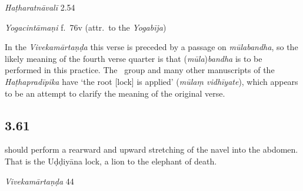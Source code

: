 \begin{ekdosis}
\begin{testimonia}[hp03_060]
\emph{Haṭharatnāvalī} 2.54
\begin{versinnote}
\end{versinnote}

\emph{Yogacintāmaṇi} f.~76v (attr.~to the \emph{Yogabīja})
\begin{versinnote}
\end{versinnote}

\end{testimonia}

\begin{philcomm}[hp03_060]
In the \emph{Vivekamārtaṇḍa} this verse is preceded by a passage on \emph{mūlabandha}, so the likely meaning of the fourth verse quarter is that (\emph{mūla})\emph{bandha} is to be performed in this practice. The \textbeta\ group and many other manuscripts of the \emph{Haṭhapradīpika} have `the root [lock] is applied' (\emph{mūlaṃ vidhīyate}), which appears to be an attempt to clarify the meaning of the original verse.
\end{philcomm}


\subsection*{3.61}
\begin{translation} should perform a rearward and upward stretching of the navel into the abdomen. That is the Uḍḍiyāna lock, a lion to the elephant of death.
\end{translation}

\begin{sources}[hp03_061]
\emph{Vivekamārtaṇḍa} 44
\begin{versinnote}
\end{versinnote}


\end{sources}
\end{ekdosis}
